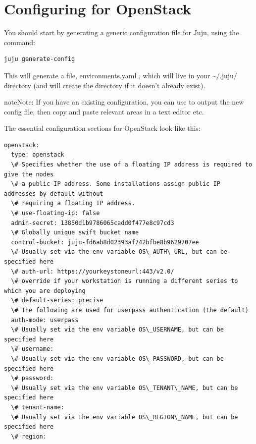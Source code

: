 \documentclass[letterpaper,10pt,english]{sphinxmanual}
\begin{document}
\chapter{Configuring for OpenStack}
\label{config-openstack:configuring-for-openstack}\label{config-openstack::doc}\label{config-openstack:videos}
You should start by generating a generic configuration file for Juju,
using the command:

\begin{Verbatim}[commandchars=\\\{\}]
juju generate-config
\end{Verbatim}

This will generate a file, environments.yaml , which will live in your
\textasciitilde{}/.juju/ directory (and will create the directory if it doesn't
already exist).

\begin{notice}{note}{Note:}
If you have an existing configuration, you can use  to output the new config file, then copy and
paste relevant areas in a text editor etc.
\end{notice}

The essential configuration sections for OpenStack look like this:

\begin{Verbatim}[commandchars=\\\{\}]
openstack:
  type: openstack
  \# Specifies whether the use of a floating IP address is required to give the nodes
  \# a public IP address. Some installations assign public IP addresses by default without
  \# requiring a floating IP address.
  \# use-floating-ip: false
  admin-secret: 13850d1b9786065cadd0f477e8c97cd3
  \# Globally unique swift bucket name
  control-bucket: juju-fd6ab8d02393af742bfbe8b9629707ee
  \# Usually set via the env variable OS\_AUTH\_URL, but can be specified here
  \# auth-url: https://yourkeystoneurl:443/v2.0/
  \# override if your workstation is running a different series to which you are deploying
  \# default-series: precise
  \# The following are used for userpass authentication (the default)
  auth-mode: userpass
  \# Usually set via the env variable OS\_USERNAME, but can be specified here
  \# username:
  \# Usually set via the env variable OS\_PASSWORD, but can be specified here
  \# password:
  \# Usually set via the env variable OS\_TENANT\_NAME, but can be specified here
  \# tenant-name:
  \# Usually set via the env variable OS\_REGION\_NAME, but can be specified here
  \# region:
\end{Verbatim}
\end{document}
